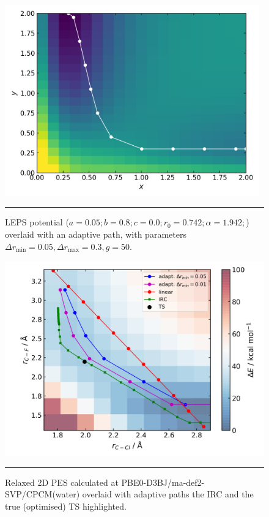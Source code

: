 \documentclass[../../main.tex]{subfiles}
\begin{document}
\begin{figure}[h!]
	\vspace{0.4cm}
	\centering
	\includegraphics[width=11cm]{5/further/figs/fig2/fig2.png}
	\vspace{0.2cm}
	\hrule
	\caption{LEPS potential ($a = 0.05;
		b = 0.8;
		c = 0.0;
		r_0 = 0.742;
		\alpha = 1.942;$) overlaid with an adaptive path, with parameters
		$\Delta r_\text{min} = 0.05, \Delta r_\text{max} = 0.3, g = 50$.}
	\label{fig::ade_further_2}
\end{figure}



\begin{figure}[h!]
	\vspace{0.4cm}
	\centering
	\includegraphics[width=12cm]{5/further/figs/fig3/fig3.png}
	\vspace{0.2cm}
	\hrule
	\caption{Relaxed 2D PES calculated at PBE0-D3BJ/ma-def2-SVP/CPCM(water) overlaid with adaptive paths the IRC and the true (optimised) TS highlighted.}
	\label{fig::ade_further_3}
\end{figure}
\end{document}
